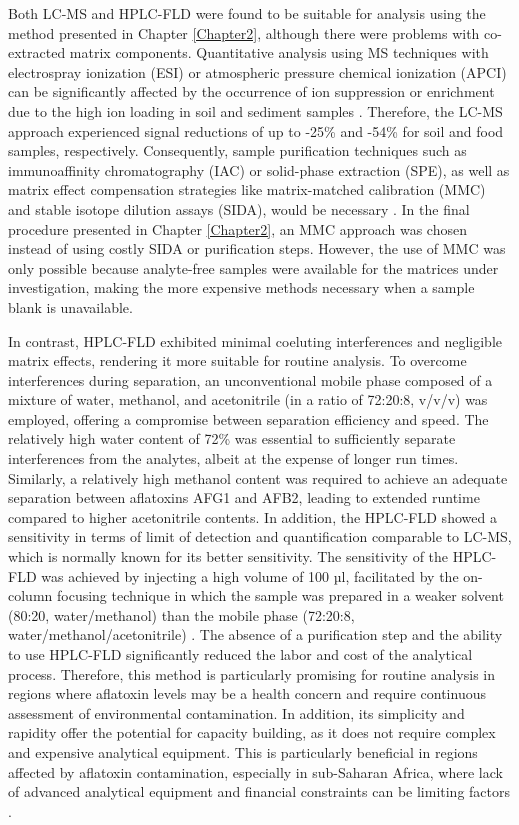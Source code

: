 Both LC-MS and HPLC-FLD were found to be suitable for analysis using the method presented in Chapter \ref{Chapter2}, although there were problems with co-extracted matrix components. Quantitative analysis using MS techniques with electrospray ionization (ESI) or atmospheric pressure chemical ionization (APCI) can be significantly affected by the occurrence of ion suppression or enrichment due to the high ion loading in soil and sediment samples \citep{trufelli2011overview}. Therefore, the LC-MS approach experienced signal reductions of up to -25\% and -54\% for soil and food samples, respectively. Consequently, sample purification techniques such as immunoaffinity chromatography (IAC) or solid-phase extraction (SPE), as well as matrix effect compensation strategies like matrix-matched calibration (MMC) and stable isotope dilution assays (SIDA), would be necessary \citep{shephard2009aflatoxin, razzazi2011sample}. In the final procedure presented in Chapter \ref{Chapter2}, an MMC approach was chosen instead of using costly SIDA or purification steps. However, the use of MMC was only possible because analyte-free samples were available for the matrices under investigation, making the more expensive methods necessary when a sample blank is unavailable.


In contrast, HPLC-FLD exhibited minimal coeluting interferences and negligible matrix effects, rendering it more suitable for routine analysis. To overcome interferences during separation, an unconventional mobile phase composed of a mixture of water, methanol, and acetonitrile (in a ratio of 72:20:8, v/v/v) was employed, offering a compromise between separation efficiency and speed. The relatively high water content of 72\% was essential to sufficiently separate interferences from the analytes, albeit at the expense of longer run times. Similarly, a relatively high methanol content was required to achieve an adequate separation between aflatoxins AFG1 and AFB2, leading to extended runtime compared to higher acetonitrile contents. In addition, the HPLC-FLD showed a sensitivity in terms of limit of detection and quantification comparable to LC-MS, which is normally known for its better sensitivity. The sensitivity of the HPLC-FLD was achieved by injecting a high volume of 100 µl, facilitated by the on-column focusing technique \citep{vissers1996optimised, mills1997assessment, groskreutz2015quantitative} in which the sample was prepared in a weaker solvent (80:20, water/methanol) than the mobile phase (72:20:8, water/methanol/acetonitrile) . The absence of a purification step and the ability to use HPLC-FLD significantly reduced the labor and cost of the analytical process. Therefore, this method is particularly promising for routine analysis in regions where aflatoxin levels may be a health concern and require continuous assessment of environmental contamination. In addition, its simplicity and rapidity offer the potential for capacity building, as it does not require complex and expensive analytical equipment. This is particularly beneficial in regions affected by aflatoxin contamination, especially in sub-Saharan Africa, where lack of advanced analytical equipment and financial constraints can be limiting factors \citep{gnonlonfin2013review}.

